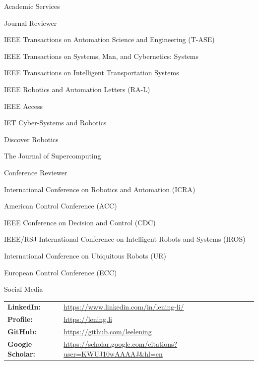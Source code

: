 \documentclass{resume} %
\begin{document}
\begin{rSection}{Academic Services}

\begin{lSubsection}{Journal Reviewer}
\item IEEE Transactions on Automation Science and Engineering (T-ASE)
\item IEEE Transactions on Systems, Man, and Cybernetics: Systems
\item IEEE Transactions on Intelligent Transportation Systems
\item IEEE Robotics and Automation Letters (RA-L)
\item IEEE Access
\item IET Cyber-Systems and Robotics
\item Discover Robotics
\item The Journal of Supercomputing
\end{lSubsection}

\begin{lSubsection}{Conference Reviewer}
\item International Conference on Robotics and Automation (ICRA)
\item American Control Conference (ACC)
\item IEEE Conference on Decision and Control (CDC)
\item IEEE/RSJ International Conference on Intelligent Robots and Systems (IROS)
\item International Conference on Ubiquitous Robots (UR)
\item European Control Conference (ECC)
\end{lSubsection}

\end{rSection}

\begin{lSection}{Social Media}
\begin{tabular}{ @{} >{\bfseries}l @{\hspace{6ex}} l } \\
LinkedIn: & \url{https://www.linkedin.com/in/lening-li/} \\
Profile: & \url{https://lening.li} \\
GitHub: & \url{https://github.com/leelening} \\
Google Scholar: & \url{https://scholar.google.com/citations?user=KWUJ10wAAAAJ\&hl=en}
\end{tabular}
\end{lSection}
\end{document}
